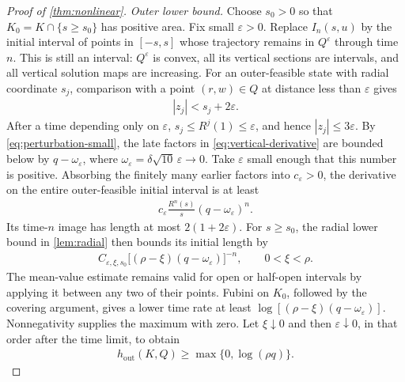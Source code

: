 \documentclass[11pt,a4paper]{article}
\theoremstyle{definition}
\theoremstyle{remark}
\begin{document}
\begin{proof}[Proof of \cref{thm:nonlinear}]
\emph{Outer lower bound.}
Choose \(s_0>0\) so that \(K_0=K\cap\{s\geq s_0\}\) has positive area. Fix small \(\varepsilon>0\). Replace \(I_n(s,u)\) by the initial interval of points in \([-s,s]\) whose trajectory remains in \(Q^\varepsilon\) through time \(n\). This is still an interval: \(Q^\varepsilon\) is convex, all its vertical sections are intervals, and all vertical solution maps are increasing. For an outer-feasible state with radial coordinate \(s_j\), comparison with a point \((r,w)\in Q\) at distance less than \(\varepsilon\) gives
\begin{align}
 |z_j|<s_j+2\varepsilon.
\end{align}
After a time depending only on \(\varepsilon\), \(s_j\leq R^j(1)\leq\varepsilon\), and hence \(|z_j|\leq3\varepsilon\). By \eqref{eq:perturbation-small}, the late factors in \eqref{eq:vertical-derivative} are bounded below by
\(q-\omega_\varepsilon\), where
\(\omega_\varepsilon=\delta\sqrt{10}\,\varepsilon\to0\).
Take \(\varepsilon\) small enough that this number is positive. Absorbing the finitely many earlier factors into \(c_\varepsilon>0\), the derivative on the entire outer-feasible initial interval is at least
\begin{align}
 c_\varepsilon\frac{R^n(s)}s(q-\omega_\varepsilon)^n.
\end{align}
Its time-\(n\) image has length at most \(2(1+2\varepsilon)\). For \(s\geq s_0\), the radial lower bound in \cref{lem:radial} then bounds its initial length by
\begin{align}
 C_{\varepsilon,\xi,s_0}
 \bigl[(\rho-\xi)(q-\omega_\varepsilon)\bigr]^{-n},
 \qquad 0<\xi<\rho.
\end{align}
The mean-value estimate remains valid for open or half-open intervals by applying it between any two of their points. Fubini on \(K_0\), followed by the covering argument, gives a lower time rate at least
\(\log[(\rho-\xi)(q-\omega_\varepsilon)]\).
Nonnegativity supplies the maximum with zero. Let \(\xi\downarrow0\) and then \(\varepsilon\downarrow0\), in that order after the time limit, to obtain
\begin{align}\label{eq:nonlinear-outer-lower}
 h_{\mathrm{out}}(K,Q)\geq\max\{0,\log(\rho q)\}.
\end{align}


\end{proof}
\end{document}

